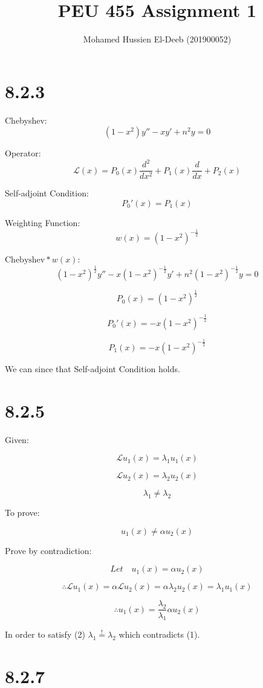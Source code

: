 \documentclass[12pt]{article}
\title{PEU 455 Assignment 1}
\author{Mohamed Hussien El-Deeb (201900052)}
\date{}
\begin{document}
\maketitle
\tableofcontents

\newcommand{\Lagr}{\mathcal{L}}

\section{8.2.3}

Chebyshev:
\[(1-x^2)y''-xy'+n^2y=0\]

Operator:
\[\Lagr(x)=P_0(x)\frac{d^2}{dx^2}+P_1(x)\frac{d}{dx}+P_2(x)\]

Self-adjoint Condition:
\[P_0'(x) = P_1(x)\]

Weighting Function:
\[w(x)={(1-x^2)}^{-\frac{1}{2}}\]

$\text{Chebyshev}*w(x)$:
\[
    {(1-x^2)}^{\frac{1}{2}}y''-x{(1-x^2)}^{-\frac{1}{2}}y'+n^2{(1-x^2)}^{-\frac{1}{2}}y=0
\]

\[
    P_0(x)={(1-x^2)}^{\frac{1}{2}}
\]

\[
    P_0'(x)= -x{(1-x^2)}^{-\frac{1}{2}}
\]

\[
    P_1(x)= -x{(1-x^2)}^{-\frac{1}{2}}
\]

We can since that Self-adjoint Condition holds.

\newpage
\section{8.2.5}

Given:

\[
    \Lagr u_1(x) = \lambda_1 u_1(x)
\]

\[
    \Lagr u_2(x) = \lambda_2 u_2(x)
\]

\[
    \lambda_1 \neq \lambda_2 \tag{1}
\]

To prove:

\[
    u_1(x) \neq \alpha u_2(x)
\]

Prove by contradiction:

\[
    Let\quad u_1(x) = \alpha u_2(x) \tag{2}
\]

\[
    \therefore \Lagr u_1(x) = \alpha \Lagr u_2(x) = \alpha \lambda_2 u_2(x) = \lambda_1 u_1(x)
\]

\[
    \therefore u_1(x) = \frac{\lambda_2}{\lambda_1} \alpha u_2(x)
\]

In order to satisfy (2) $\lambda_1 \overset{!}{=} \lambda_2$ which contradicts (1).

\newpage
\section{8.2.7}
\end{document}
